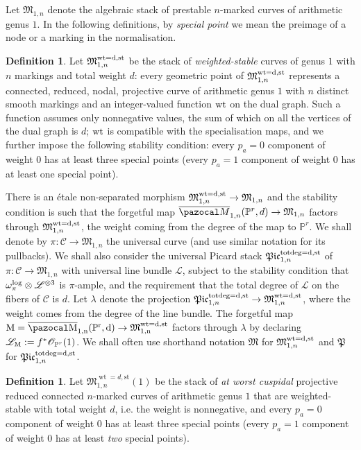 \documentclass[11pt]{amsart}
\newcommand{\M}[4]{\overline{\pazocal M}_{#1,#2}(#3,#4)}
\newcommand{\PP}{\mathbb P}
\newcommand{\OO}{\mathcal O}
\renewcommand{\to}{\rightarrow}
\newcommand{\cC}{\mathcal C}
\newcommand{\MM}{\mathfrak M}
\newcommand{\PtoM}{\lambda}
\theoremstyle{plain}
\theoremstyle{definition}
\newtheorem{dfn}[thm]{Definition}
\begin{document}
Let $\MM_{1,n}$ denote the algebraic stack of prestable $n$-marked curves of arithmetic genus $1$. In the following definitions, by \emph{special point} we mean the preimage of a node or a marking in the normalisation.
\begin{dfn}
Let $\mathfrak M_{1,n}^{\rm{wt}=d,\rm{st}}$ be the stack of \emph{weighted-stable} curves of genus $1$ with $n$ markings and total weight $d$: every geometric point of $\mathfrak M_{1,n}^{\rm{wt}=d,\rm{st}}$ represents a connected, reduced, nodal, projective curve of arithmetic genus $1$ with $n$ distinct smooth markings and an integer-valued function $\rm{wt}$ on the dual graph. Such a function assumes only nonnegative values, the sum of which on all the vertices of the dual graph is $d$; $\rm{wt}$ is compatible with the specialisation maps, and we further impose the following stability condition: every $p_a=0$ component of weight $0$ has at least three special points (every $p_a=1$ component of weight $0$ has at least one special point).
\end{dfn}
There is an \'{e}tale non-separated morphism $\mathfrak M_{1,n}^{\rm{wt}=d,\rm{st}}\to\mathfrak M_{1,n}$ and the stability condition is such that the forgetful map $\M{1}{n}{\PP^r}{d}\to\mathfrak M_{1,n}$ factors through $\mathfrak M_{1,n}^{\rm{wt}=d,\rm{st}}$, the weight coming from the degree of the map to $\PP^r$.
We shall denote by $\pi\colon \cC\to \MM_{1,n}$ the universal curve (and use similar notation for its pullbacks). We shall also consider the universal Picard stack $\mathfrak{Pic}^{\rm{tot deg}=d,\rm{st}}_{1,n}$ of $\pi\colon \cC\to \MM_{1,n}$ with universal line bundle $\mathcal{L}$, subject to the stability condition that $\omega_\pi^{\rm{log}}\otimes\mathcal L^{\otimes 3}$ is $\pi$-ample, and the requirement that the total degree of $\mathcal L$ on the fibers of $\cC$ is $d$. Let $\PtoM$ denote the projection $\mathfrak{Pic}^{\rm{tot deg}=d,\rm{st}}_{1,n}\to \mathfrak M_{1,n}^{\rm{wt}=d,\rm{st}}$, where the weight comes from the degree of the line bundle. The forgetful map $\rm M=\M{1}{n}{\PP^r}{d}\to\mathfrak M_{1,n}^{\rm{wt}=d,\rm{st}}$ factors through $\PtoM$ by declaring $\mathcal L_{\rm M}:=f^*\OO_{\PP^r}(1)$. We shall often use shorthand notation $\MM$ for $\mathfrak M_{1,n}^{\rm{wt}=d,\rm{st}}$ and $\mathfrak P$ for $\mathfrak{Pic}^{\rm{tot deg}=d,\rm{st}}_{1,n}$.

\begin{dfn}
Let $\mathfrak M_{1,n}^{\operatorname{wt}=d,\text{st}}(1)$ be the stack of \emph{at worst cuspidal} projective reduced connected $n$-marked curves of arithmetic genus $1$ that are weighted-stable with total weight $d$, i.e. the weight is nonnegative, and every $p_a=0$ component of weight $0$ has at least three special points (every $p_a=1$ component  of weight $0$ has at least \emph{two} special points).
\end{dfn}
\end{document}
